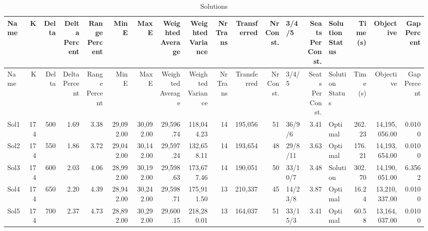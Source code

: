 \documentclass[a4paper]{article}
\begin{document}
{\scriptsize
\begin{longtable}{lrrrrrrrrrrrlrlrrr}
\caption{Solutions}
\\ \toprule
Name &K &Delta &\shortstack{Delta\\Percent} &\shortstack{Range\\Percent} &Min E &Max E &\shortstack{Weighted\\Average} &\shortstack{Weighted\\Variance} &\shortstack{Nr\\Trans} &Transferred &\shortstack{Nr\\Const.} &3/4/5 &\shortstack{Seats\\Per\\Const.} &\shortstack{Solution\\Status} &\shortstack{Time\\(s)} &Objective &\shortstack{Gap\\Percent} \\ \midrule
\endfirsthead
\toprule
Name &K &Delta &\shortstack{Delta\\Percent} &\shortstack{Range\\Percent} &Min E &Max E &\shortstack{Weighted\\Average} &\shortstack{Weighted\\Variance} &\shortstack{Nr\\Trans} &Transferred &\shortstack{Nr\\Const.} &3/4/5 &\shortstack{Seats\\Per\\Const.} &\shortstack{Solution\\Status} &\shortstack{Time\\(s)} &Objective &\shortstack{Gap\\Percent} \\ \midrule
\endhead
\bottomrule
\endfoot
Sol1&174&500& 1.69& 3.38&29,092.00&30,092.00&29,596.74&118,044.23&14&195,056&51&36/9/6& 3.41&Optimal&262.23&14,195,056.00&0.0100\\ 
Sol2&174&550& 1.86& 3.72&29,042.00&30,142.00&29,597.24&132,658.11&14&193,654&48&29/8/11& 3.63&Optimal&176.21&14,193,654.00&0.0100\\ 
Sol3&174&600& 2.03& 4.06&28,992.00&30,192.00&29,598.63&173,677.46&14&190,051&50&33/10/7& 3.48&Solution&302.70&14,190,051.00&6.3562\\ 
Sol4&174&650& 2.20& 4.39&28,942.00&30,242.00&29,598.71&175,911.50&13&210,337&45&14/23/8& 3.87&Optimal&16.24&13,210,337.00&0.0100\\ 
Sol5&174&700& 2.37& 4.73&28,892.00&30,292.00&29,600.15&218,280.01&13&164,037&51&33/15/3& 3.41&Optimal&60.58&13,164,037.00&0.0100\\ 

\end{longtable}}
\end{document}
